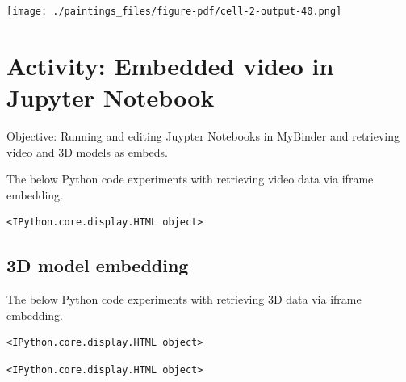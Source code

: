 \documentclass[
  letterpaper,
]{book}
\begin{document}
\texttt{[image: ./paintings\_files/figure-pdf/cell-2-output-40.png]}


\hypertarget{activity-embedded-video-in-jupyter-notebook}{%
\chapter{Activity: Embedded video in Jupyter
Notebook}\label{activity-embedded-video-in-jupyter-notebook}}

Objective: Running and editing Juypter Notebooks in MyBinder and
retrieving video and 3D models as embeds.

The below Python code experiments with retrieving video data via iframe
embedding.

\begin{verbatim}
<IPython.core.display.HTML object>
\end{verbatim}

\hypertarget{d-model-embedding}{%
\section{3D model embedding}\label{d-model-embedding}}

The below Python code experiments with retrieving 3D data via iframe
embedding.

\begin{verbatim}
<IPython.core.display.HTML object>
\end{verbatim}

\begin{verbatim}
<IPython.core.display.HTML object>
\end{verbatim}


\backmatter
\end{document}
